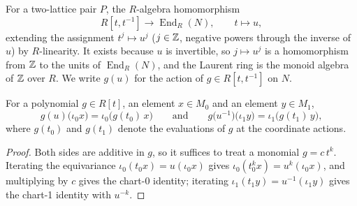 \begin{definition}
  \label{pa-def:twoLattice_laurentToEnd}
  \leanok

  For a two-lattice pair \(P\), the \(R\)-algebra homomorphism
  \[
    R[t, t^{-1}] \longrightarrow \operatorname{End}_R(N), \qquad t \longmapsto u ,
  \]
  extending the assignment \(t^j \mapsto u^j\) (\(j \in \mathbb{Z}\), negative powers through
  the inverse of \(u\)) by \(R\)-linearity. It exists because \(u\) is invertible, so
  \(j \mapsto u^j\) is a homomorphism from \(\mathbb{Z}\) to the units of
  \(\operatorname{End}_R(N)\), and the
  Laurent ring is the monoid algebra of \(\mathbb{Z}\) over \(R\). We write \(g(u)\) for the
  action of \(g \in R[t,t^{-1}]\) on \(N\).
\end{definition}

\begin{lemma}
  \label{pa-lem:twoLattice_laurent_intertwine}
  \leanok

  For a polynomial \(g \in R[t]\), an element \(x \in M_0\) and an element
  \(y \in M_1\),
  \[
    g(u)\bigl(\iota_0 x\bigr) = \iota_0\bigl(g(t_0)\, x\bigr)
    \qquad\text{and}\qquad
    g\bigl(u^{-1}\bigr)\bigl(\iota_1 y\bigr) = \iota_1\bigl(g(t_1)\, y\bigr) ,
  \]
  where \(g(t_0)\) and \(g(t_1)\) denote the evaluations of \(g\) at the coordinate
  actions.
\end{lemma}
\begin{proof}
  \leanok
  Both sides are additive in \(g\), so it suffices to treat a monomial
  \(g = c\,t^k\). Iterating the equivariance \(\iota_0(t_0 x) = u(\iota_0 x)\) gives
  \(\iota_0(t_0^k x) = u^k(\iota_0 x)\), and multiplying by \(c\) gives the chart-0
  identity; iterating \(\iota_1(t_1 y) = u^{-1}(\iota_1 y)\) gives the chart-1
  identity with \(u^{-k}\).
\end{proof}

